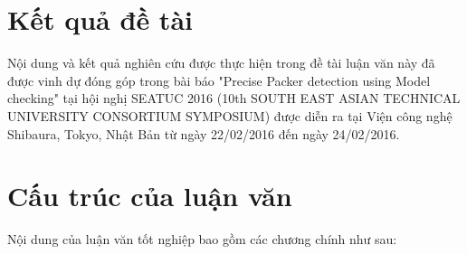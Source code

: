 \section{Kết quả đề tài}

\hspace{0.5cm}Nội dung và kết quả nghiên cứu được thực hiện trong đề tài luận văn này đã được vinh dự đóng góp trong bài báo "Precise Packer detection using Model checking" tại hội nghị SEATUC 2016 (10th SOUTH EAST ASIAN TECHNICAL UNIVERSITY CONSORTIUM SYMPOSIUM) được diễn ra tại Viện công nghệ Shibaura, Tokyo, Nhật Bản từ ngày 22/02/2016 đến ngày 24/02/2016.

\section{Cấu trúc của luận văn}

\hspace{0.5cm}Nội dung của luận văn tốt nghiệp bao gồm các chương chính như sau:

